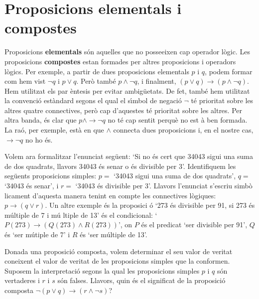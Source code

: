 \section{Proposicions elementals i compostes}

Proposicions \textbf{elementals} s\'{o}n aquelles que no posseeixen cap
operador l\`{o}gic. Les proposicions \textbf{compostes} estan formades per
altres proposicions i operadors l\`{o}gics. Per exemple, a partir de dues
proposicions elementals $p$ i $q$, podem formar com hem vist $\lnot q$ i $%
p\vee q$. Per\`{o} tamb\'{e} $p\wedge\lnot q$, i finalment, $\left( p\vee
q\right) \longrightarrow\left( p\wedge\lnot q\right) $. Hem utilitzat els par%
\`{e}ntesis per evitar ambig\"{u}etats. De fet, tamb\'{e} hem utilitzat la
convenci\'{o} est\`{a}ndard segons el qual el s\'{\i}mbol de negaci\'{o} $%
\lnot$ t\'{e} prioritat sobre les altres quatre connectives, per\`{o} cap
d'aquestes t\'{e} prioritat sobre les altres. Per altra banda, \'{e}s clar
que $p\wedge\longrightarrow\lnot q$ no t\'{e} cap sentit perqu\`{e} no est%
\`{a} ben formada. La ra\'{o}, per exemple, est\`{a} en que $\wedge$
connecta dues proposicions i, en el nostre cas, $\longrightarrow\lnot q$ no
ho \'{e}s.

Volem ara formalitzar l'enunciat seg\"{u}ent: `Si no \'{e}s cert que 34043
sigui una suma de dos quadrats, llavors 34043 \'{e}s senar o \'{e}s
divisible per 3'. Identifiquem les seg\"{u}ents proposicions simples: $p=$
`34043 sigui una suma de dos quadrats', $q=$ `34043 \'{e}s senar', i $r=$
`34043 \'{e}s divisible per 3'. Llavors l'enunciat s'escriu simb\`{o}%
licament d'aquesta manera tenint en compte les connectives l\`{o}giques: $%
p\longrightarrow\left( q\vee r\right) $. Un altre exemple \'{e}s la proposici%
\'{o} `273 \'{e}s divisible per 91, si 273 \'{e}s m\'{u}ltiple de 7 i m\'{u}%
ltiple de 13' \'{e}s el condicional: `$P(273)\longrightarrow\left(
Q(273)\wedge R(273)\right) $', on $P$ \'{e}s el predicat `ser divisible per
91', $Q$ \'{e}s `ser m\'{u}tiple de 7' i $R$ \'{e}s `ser m\'{u}ltiple de 13'.

\bigskip

Donada una proposici\'{o} composta, volem determinar el seu valor de veritat
coneixent el valor de veritat de les proposicions simples que la conformen.
Suposem la interpretaci\'{o} segons la qual les proposicions simples $p$ i $%
q $ s\'{o}n vertaderes i $r$ i $s$ s\'{o}n falses. Llavors, quin \'{e}s el
significat de la proposici\'{o} composta $\lnot\left( p\vee q\right)
\longrightarrow\left( r\wedge\lnot s\right) $?

